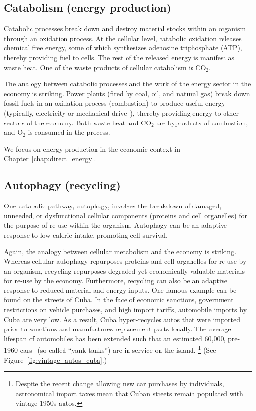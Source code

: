 \subsection{Catabolism (energy production)}
\label{sec:catabolism}

Catabolic processes break down and destroy material stocks within an organism
through an oxidation process.
At the cellular level, catabolic oxidation releases chemical free energy, 
some of which synthesizes adenosine triphosphate (ATP), 
thereby providing fuel to cells. 
The rest of the released energy is manifest as waste heat.
One of the waste products of cellular catabolism is CO$_2$.

The analogy between catabolic processes and the work 
of the energy sector in the economy is striking.
Power plants (fired by coal, oil, and natural gas) break down fossil fuels
in an oxidation process (combustion) to produce useful energy 
(typically, electricity or mechanical drive~\cite{Ayres:2010ug}), 
thereby providing energy to other sectors of the economy.
Both waste heat and CO$_2$ are byproducts of combustion, 
and O$_2$ is consumed in the process.

We focus on energy production in the economic context 
in Chapter~\ref{chap:direct_energy}.


\subsection{Autophagy (recycling)}
\label{sec:autophagy}

One catabolic pathway, autophagy, 
involves the breakdown of damaged, unneeded, or dysfunctional cellular components 
(proteins and cell organelles)
for the purpose of re-use within the organism. 
Autophagy can be an adaptive response to low calorie intake,
promoting cell survival.

Again, the analogy between cellular metabolism and the economy is striking.
Whereas cellular autophagy repurposes proteins and cell organelles
for re-use by an organism,
recycling repurposes degraded
yet economically-valuable materials
for re-use by the economy.
Furthermore, recycling can also be an adaptive response 
to reduced material and energy inputs.
One famous example can be found on the streets of Cuba.
In the face of economic sanctions,
government restrictions on vehicle purchases, and
high import tariffs,
automobile imports by Cuba are very low.
As a result, Cuba hyper-recycles autos that were imported
prior to sanctions and manufactures replacement parts locally.
The average lifespan of automobiles has been extended
such that an estimated 60,000, pre-1960 cars~\cite{Schweid:2004aa} 
(so-called ``yank tanks'') are in service on the island.%
	\footnote{Despite the recent change allowing new car purchases by individuals,
	astronomical import taxes mean that Cuban streets remain populated 
	with vintage 1950s autos.\cite{Ramey:2014aa}
	}
(See Figure~\ref{fig:vintage_autos_cuba}.)

